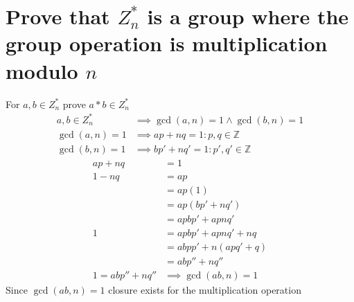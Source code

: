 \documentclass[letterpaper]{article}
\begin{document}
\section{Prove that $Z_n^*$ is a group where the group operation is multiplication modulo $n$}
For $a,b\in Z_n^*$ prove $a*b \in Z_n^*$
\begin{align*}
a,b\in Z_n^* &\implies \gcd(a,n)=1 \wedge \gcd(b,n) =1\\
\gcd(a,n)=1 &\implies ap + nq = 1: p,q\in\mathbb{Z}\\
\gcd(b,n) =1 &\implies bp' + nq' = 1: p',q'\in\mathbb{Z}
\end{align*}
\begin{align*}
ap + nq &= 1\\
1-nq &= ap \\
&= ap(1) \\
&= ap(bp'+nq')\\
&= apbp'+apnq'\\
1 &= apbp'+apnq' +nq\\
&= abpp' + n(apq'+q)\\
&= abp'' + nq''\\
1 = abp'' + nq'' &\implies \gcd(ab,n)=1
\end{align*}
Since $\gcd(ab,n)=1$ closure exists for the multiplication operation
\end{document}

